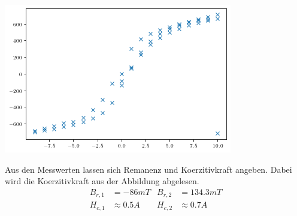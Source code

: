 \includegraphics[width=\textwidth]{pictures/HysteresekurveGemessen3.png}    %

Aus den Messwerten lassen sich Remanenz und Koerzitivkraft angeben.
Dabei wird die Koerzitivkraft aus der Abbildung abgelesen.
\begin{align*}
  B_{r,1} &= -86 mT &  B_{r,2} &= 134.3 mT \\
  H_{c,1} &\approx 0.5A & H_{c,2} &\approx 0.7A
\end{align*}